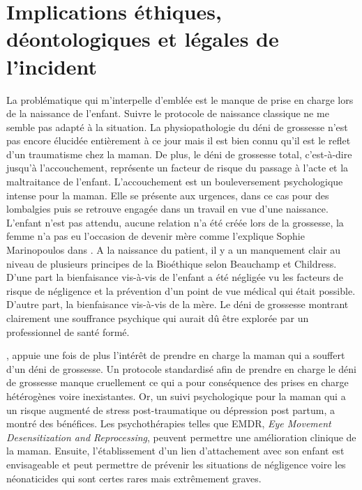 \section{Implications éthiques, déontologiques et légales de l’incident }

La problématique qui m’interpelle d’emblée est le manque de prise en charge lors de la naissance de l’enfant. Suivre le protocole de naissance classique ne me semble pas adapté à la situation. La physiopathologie du déni de grossesse n’est pas encore élucidée entièrement à ce jour mais il est bien connu qu’il est le reflet d’un traumatisme chez la maman. De plus, le déni de grossesse total, c’est-à-dire jusqu’à l’accouchement, représente un facteur de risque du passage à l’acte et la maltraitance de l’enfant. L’accouchement est un bouleversement psychologique intense pour la maman. Elle se présente aux urgences, dans ce cas pour des lombalgies puis se retrouve engagée dans un travail  en vue d’une naissance. L’enfant n’est pas attendu, aucune relation n’a été créée lors de la grossesse, la femme n’a pas eu l’occasion de devenir mère comme l’explique Sophie Marinopoulos dans \textcite{marinopoulos_deni_2019}. A la naissance du patient, il y a un manquement clair au niveau de plusieurs principes de la Bioéthique selon Beauchamp et Childress. D’une part la bienfaisance vis-à-vis de l’enfant a été négligée vu les facteurs de risque de négligence et la prévention d’un point de vue médical qui était possible. D’autre part, la bienfaisance vis-à-vis de la mère. Le déni de grossesse montrant clairement une souffrance psychique qui aurait dû être explorée par un professionnel de santé formé.

,  \textcite{lagedamon2025accompagnement} appuie une fois de plus l’intérêt de prendre en charge la maman qui a souffert d’un déni de grossesse. Un protocole standardisé afin de prendre en charge le déni de grossesse manque cruellement ce qui a pour conséquence des prises en charge hétérogènes voire inexistantes. Or, un suivi psychologique pour la maman qui a un risque augmenté de stress post-traumatique ou dépression post partum, a montré des bénéfices. Les psychothérapies telles que EMDR, \textit{Eye Movement Desensitization and Reprocessing}, peuvent permettre une amélioration clinique de la maman. Ensuite, l’établissement d’un lien d’attachement avec son enfant est envisageable et peut permettre de prévenir les situations de négligence voire les néonaticides qui sont certes rares mais extrêmement graves.

